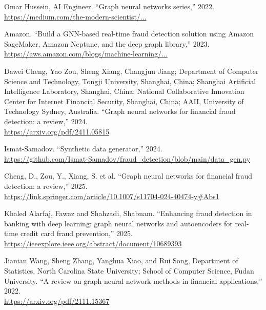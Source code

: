 \documentclass[conference]{IEEEtran}
\begin{document}
\begin{thebibliography}{99}
Omar Hussein, AI Engineer. ``Graph neural networks series,'' 2022.\\
\href{https://medium.com/the-modern-scientist/graph-neural-networks-series-part-2-graph-statistics-4f271857ec70}{https://medium.com/the-modern-scientist/...}

Amazon. ``Build a GNN-based real-time fraud detection solution using Amazon SageMaker, Amazon Neptune, and the deep graph library,'' 2023.\\
\href{https://aws.amazon.com/blogs/machine-learning/build-a-gnn-based-real-time-fraud-detection-solution-using-amazon-sagemaker-amazon-neptune-and-the-deep-graph-library/?utm_source=chatgpt.com}{https://aws.amazon.com/blogs/machine-learning/...}


Dawei Cheng, Yao Zou, Sheng Xiang, Changjun Jiang; Department of Computer Science and Technology, Tongji University, Shanghai, China; Shanghai Artificial Intelligence Laboratory, Shanghai, China; National Collaborative Innovation Center for Internet Financial Security, Shanghai, China; AAII, University of Technology Sydney, Australia. ``Graph neural networks for financial fraud detection: a review,'' 2024.\\
\href{https://arxiv.org/pdf/2411.05815}{https://arxiv.org/pdf/2411.05815}

Ismat-Samadov. ``Synthetic data generator,'' 2024.\\
\href{https://github.com/Ismat-Samadov/fraud_detection/blob/main/data_gen.py}{https://github.com/Ismat-Samadov/fraud_detection/blob/main/data_gen.py}


Cheng, D., Zou, Y., Xiang, S. et al. ``Graph neural networks for financial fraud detection: a review,'' 2025.\\
\href{https://link.springer.com/article/10.1007/s11704-024-40474-y#Abs1}{https://link.springer.com/article/10.1007/s11704-024-40474-y#Abs1}


Khaled Alarfaj, Fawaz and Shahzadi, Shabnam. ``Enhancing fraud detection in banking with deep learning: graph neural networks and autoencoders for real-time credit card fraud prevention,'' 2025.\\
\href{https://ieeexplore.ieee.org/abstract/document/10689393}{https://ieeexplore.ieee.org/abstract/document/10689393}


Jianian Wang, Sheng Zhang, Yanghua Xiao, and Rui Song, Department of Statistics, North Carolina State University; School of Computer Science, Fudan University. ``A review on graph neural network methods in financial applications,'' 2022.\\
\href{https://arxiv.org/pdf/2111.15367}{https://arxiv.org/pdf/2111.15367}


\end{thebibliography}
\end{document}
